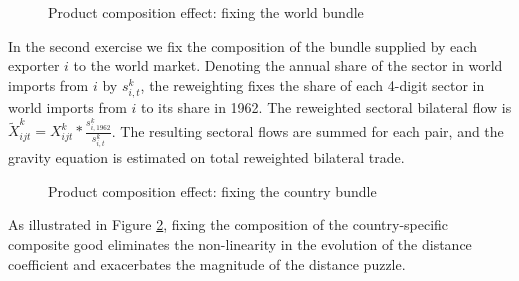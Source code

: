 \documentclass[12pt,twoside,a4paper,notitlepage]{article}
\begin{document}
\begin{figure}[h!]
\caption{Product composition effect: fixing the world bundle  \label{fig:compworld}}
\begin{center}
\setlength{\fboxrule}{1pt} %
\setlength{\fboxsep}{.1in} %
\end{center}
\end{figure}

In the second exercise we fix the composition of the bundle supplied by each exporter $i$ to the world market.
Denoting the annual share of the sector in world imports from $i$ by $s^{k}_{i,t}$, the reweighting fixes the share of each 4-digit sector in world imports from $i$ to its share in 1962.
The reweighted sectoral bilateral flow is $\tilde{X}^k_{ijt}=X^k_{ijt}*\frac{s^k_{i,1962}}{s^k_{i,t}}$.
The resulting sectoral flows are summed for each pair, and the gravity equation is estimated on total reweighted bilateral trade.
 

\begin{figure}[h!]
\caption{Product composition effect: fixing the country bundle  \label{fig:compbundle}}
\begin{center}
\setlength{\fboxrule}{1pt} %
\setlength{\fboxsep}{.1in} %
\end{center}
\end{figure}

As illustrated in Figure \ref{fig:compbundle}, fixing the composition of the country-specific composite good  eliminates the non-linearity in the evolution of the distance coefficient and \fi
exacerbates the magnitude of the distance puzzle.
\end{document}
